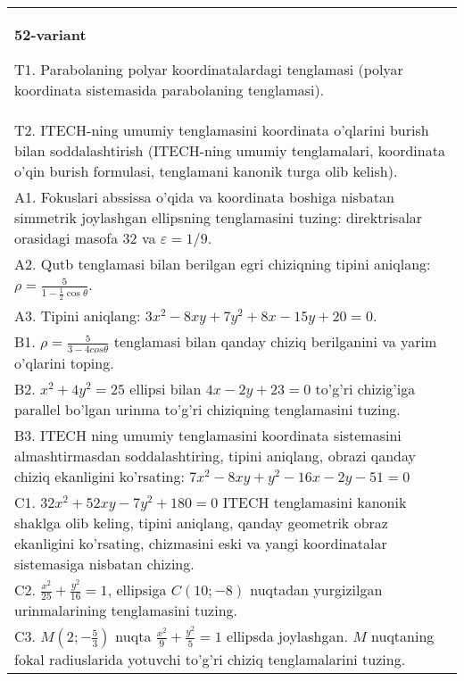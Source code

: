 \documentclass{article}
\begin{document}
\begin{tabular}{m{17cm}}
\textbf{52-variant}
\newline

T1. Parabolaning polyar koordinatalardagi tenglamasi (polyar koordinata sistemasida parabolaning tenglamasi).\\

T2. ITECH-ning umumiy tenglamasini koordinata o'qlarini burish bilan soddalashtirish (ITECH-ning umumiy tenglamalari, koordinata o'qin burish formulasi, tenglamani kanonik turga olib kelish).\\

A1. Fokuslari abssissa o'qida va koordinata boshiga nisbatan simmetrik joylashgan ellipsning tenglamasini tuzing: direktrisalar orasidagi masofa $32$ va $\varepsilon=1/9$.\\

A2. Qutb tenglamasi bilan berilgan egri chiziqning tipini aniqlang: $\rho=\frac{5}{1-\frac{1}{2}\cos\theta}$.\\

A3. Tipini aniqlang: $3x^{2}-8xy+7y^{2}+8x-15y+20=0$.\\

B1. $\rho = \frac{5}{3 - 4cos\theta}$ tenglamasi bilan qanday chiziq berilganini va yarim o'qlarini toping.  \\

B2. $x^{2} + 4y^{2} = 25$ ellipsi bilan $4x - 2y + 23 = 0$ to'g'ri chizig'iga parallel bo'lgan urinma to'g'ri chiziqning tenglamasini tuzing.  \\

B3. ITECH ning umumiy tenglamasini koordinata sistemasini almashtirmasdan soddalashtiring, tipini aniqlang, obrazi qanday chiziq ekanligini ko'rsating: $7x^{2} - 8xy + y^{2} - 16x - 2y - 51 = 0$\\

C1. $32x^{2} + 52xy - 7y^{2} + 180 = 0$ ITECH tenglamasini kanonik shaklga olib keling, tipini aniqlang, qanday geometrik obraz ekanligini ko'rsating, chizmasini eski va yangi koordinatalar sistemasiga nisbatan chizing.  \\

C2. $\frac{x^{2}}{25} + \frac{y^{2}}{16} = 1$, ellipsiga $C(10; - 8)$ nuqtadan yurgizilgan urinmalarining tenglamasini tuzing.  \\

C3. $M(2; - \frac{5}{3})$ nuqta $\frac{x^{2}}{9} + \frac{y^{2}}{5} = 1$ ellipsda joylashgan. $M$ nuqtaning fokal radiuslarida yotuvchi to'g'ri chiziq tenglamalarini tuzing.  \\

\end{tabular}
\vspace{1cm}
\end{document}
